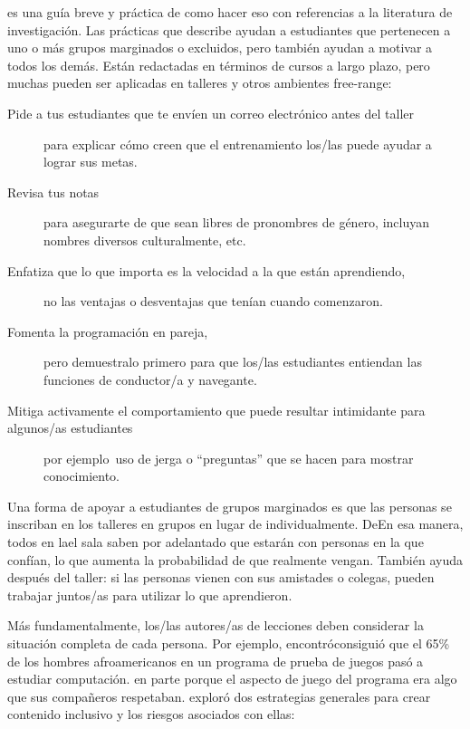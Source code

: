 \cite{Lee2017} es una guía breve y práctica de como hacer eso con referencias a la literatura de investigación.
Las prácticas que describe ayudan a estudiantes que pertenecen a uno o más grupos marginados o excluidos,
pero también ayudan a motivar a todos los demás.
Están redactadas en términos de cursos a largo plazo,
pero muchas pueden ser aplicadas en talleres y otros ambientes free-range:

\begin{description}

\item[Pide a tus estudiantes que te envíen un correo electrónico antes del taller]
  para explicar cómo creen que el entrenamiento los/las puede ayudar a lograr sus metas.

\item[Revisa tus notas]
  para asegurarte de que sean libres de pronombres de género, incluyan nombres diversos culturalmente, etc.

\item[Enfatiza que lo que importa es la velocidad a la que están aprendiendo,]
  no las ventajas o desventajas que tenían cuando comenzaron.

\item[Fomenta la programación en pareja,]
  pero demuestralo primero para que los/las estudiantes entiendan las funciones de conductor/a y navegante.

\item[Mitiga activamente el comportamiento que puede resultar intimidante para algunos/as estudiantes]
  por ejemplo\ uso de jerga o ``preguntas'' que se hacen para mostrar conocimiento.

\end{description}

Una forma de apoyar a estudiantes de grupos marginados es
que las personas se inscriban en los talleres en grupos en lugar de individualmente.
DeEn esa manera,
todos en lael sala saben por adelantado que estarán con personas en la que confían,
lo que aumenta la probabilidad de que realmente vengan.
También ayuda después del taller:
si las personas vienen con sus amistades o colegas,
pueden trabajar juntos/as para utilizar lo que aprendieron.

Más fundamentalmente,
los/las autores/as de lecciones deben considerar la situación completa de cada persona.
Por ejemplo,
\cite{DiSa2014a} encontróconsiguió que el 65\% de los hombres afroamericanos en un programa de prueba de juegos pasó a estudiar computación.
en parte porque el aspecto de juego del programa era algo que sus compañeros respetaban.
\cite{Lach2018} exploró dos estrategias generales para crear contenido inclusivo y los riesgos asociados con ellas:

